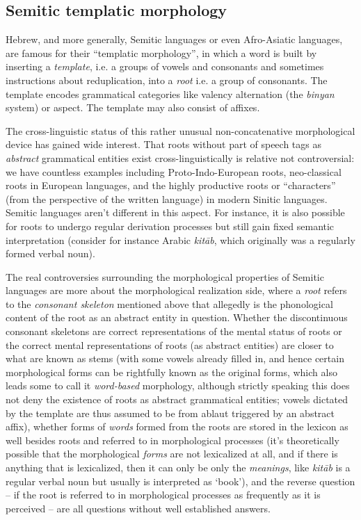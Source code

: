 \documentclass[a4paper, oneside, 12pt]{report}
\newcommand*{\term}[1]{\emph{#1}}
\newcommand{\form}[1]{\emph{#1}}
\newcommand{\translate}[1]{`#1'}
\begin{document}
\subsection{Semitic templatic morphology}

Hebrew, and more generally, Semitic languages or even Afro-Asiatic languages,
are famous for their ``templatic morphology'',
in which a word is built by inserting a \term{template},
i.e. a groups of vowels and consonants and sometimes instructions about reduplication,
into a \term{root} i.e. a group of consonants.
The template encodes grammatical categories like valency alternation
(the \form{binyan} system) or aspect.
The template may also consist of affixes.

The cross-linguistic status of this rather unusual non-concatenative morphological device has gained wide interest.
That roots without part of speech tags as \emph{abstract} grammatical entities exist cross-linguistically
is relative not controversial:
we have countless examples including Proto-Indo-European roots,
neo-classical roots in European languages,
and the highly productive roots or ``characters'' (from the perspective of the written language) in modern Sinitic languages.
Semitic languages aren't different in this aspect.
For instance, it is also possible for roots to undergo regular derivation processes
but still gain fixed semantic interpretation
(consider for instance Arabic \form{kitāb}, which originally was a regularly formed verbal noun).

The real controversies surrounding the morphological properties of Semitic languages
are more about the morphological realization side,
where a \term{root} refers to the \emph{consonant skeleton} mentioned above
that allegedly is the phonological content of the root as an abstract entity in question.
Whether the discontinuous consonant skeletons are correct representations of the mental status of roots
or the correct mental representations of roots (as abstract entities) are closer to what are known as stems
(with some vowels already filled in, and hence certain morphological forms
can be rightfully known as the original forms,
which also leads some to call it \term{word-based} morphology,
although strictly speaking this does not deny the existence of roots as abstract grammatical entities;
vowels dictated by the template are thus assumed to be from ablaut triggered by an abstract affix),
whether forms of \emph{words} formed from the roots are stored in the lexicon as well besides roots
and referred to in morphological processes
(it's theoretically possible that the morphological \emph{forms} are not lexicalized at all,
and if there is anything that is lexicalized,
then it can only be only the \emph{meanings},
like \form{kitāb} is a regular verbal noun but usually is interpreted as \translate{book}),
and the reverse question -- if the root is referred to in morphological processes
as frequently as it is perceived --
are all questions without well established answers.
\end{document}
